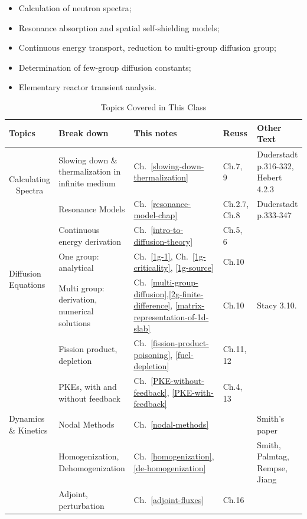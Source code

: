 \documentclass{school-22.211-notes}
\date{February  8, 2012}
\begin{document}
\maketitle

\begin{itemize}
  \item Calculation of neutron spectra;
  \item Resonance absorption and spatial self-shielding models;
  \item Continuous energy transport, reduction to multi-group diffusion group;
  \item Determination of few-group diffusion constants;
  \item Elementary reactor transient analysis.
\end{itemize}

\begin{table}[ht]
  \centering
  \begin{tabular}{|p{1in}|p{2in}|p{0.65in}|p{0.6in}|p{1.5in}|} \hline
    Topics & Break down  & This notes & Reuss & Other Text \\ \hline
    \multicolumn{1}{|c|}{\multirow{2}{*}{Calculating Spectra}} & Slowing down \& thermalization in infinite medium   & Ch.~\ref{slowing-down-thermalization} & Ch.7, 9  & Duderstadt p.316-332, Hebert 4.2.3 \\ 
    & Resonance Models & Ch.~\ref{resonance-model-chap} & Ch.2.7, Ch.8 & Duderstadt p.333-347 \\ \hline
    \multirow{3}{*}{Diffusion Equations} & Continuous energy derivation & Ch.~\ref{intro-to-diffusion-theory} & Ch.5, 6 & \\ 
    & One group: analytical & Ch.~\ref{1g-1}, Ch.~\ref{1g-criticality}, \ref{1g-source} & Ch.10  &  \\ 
    & Multi group: derivation, numerical solutions & Ch.~\ref{multi-group-diffusion},\ref{2g-finite-difference}, \ref{matrix-representation-of-1d-slab} & Ch.10  &  Stacy 3.10. \\ \hline
   \multirow{5}{*}{Dynamics \& Kinetics} & Fission product, depletion & Ch.~\ref{fission-product-poisoning}, \ref{fuel-depletion} & Ch.11, 12 &  \\
    & PKEs, with and without feedback & Ch.~\ref{PKE-without-feedback}, \ref{PKE-with-feedback}  & Ch.4, 13 & \\
    & Nodal Methods  & Ch.~\ref{nodal-methods}  &  & Smith's paper \\
    & Homogenization, Dehomogenization & Ch.~\ref{homogenization}, \ref{de-homogenization}  &  &Smith, Palmtag, Rempse, Jiang \\
    & Adjoint, perturbation & Ch.~\ref{adjoint-fluxes} & Ch.16 & \\ \hline 
  \end{tabular}
  \caption{Topics Covered in This Class}
\end{table}
\end{document}
